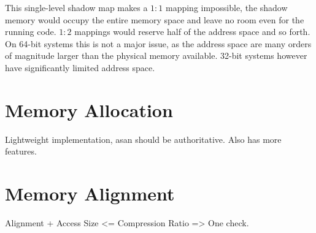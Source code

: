 This single-level shadow map makes a $1:1$ mapping impossible, the shadow memory
would occupy the entire memory space and leave no room even for the running
code. $1:2$ mappings would reserve half of the address space and so forth. On
64-bit systems this is not a major issue, as the address space are many orders
of magnitude larger than the physical memory available. 32-bit systems however
have significantly limited address space.


\section {Memory Allocation}
Lightweight implementation, asan should be authoritative. Also has more
features.


\section {Memory Alignment}

Alignment + Access Size <= Compression Ratio => One check.

